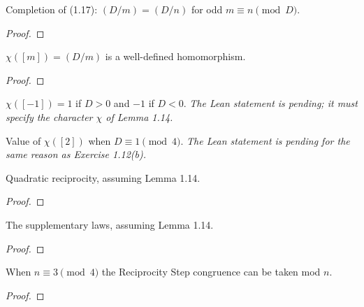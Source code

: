\begin{theorem}[Exercise 1.11]
  \label{exr:s1_11}
  \leanok
  Completion of (1.17): $(D/m) = (D/n)$ for odd $m \equiv n \pmod D$.
\end{theorem}
\begin{proof}\end{proof}

\begin{theorem}[Exercise 1.12(a)]
  \label{exr:s1_12_a}
  \leanok
  $\chi([m]) = (D/m)$ is a well-defined homomorphism.
\end{theorem}
\begin{proof}\end{proof}

\begin{theorem}[Exercise 1.12(b)]
  \label{exr:s1_12_b}
  \notready
  $\chi([-1]) = 1$ if $D > 0$ and $-1$ if $D < 0$. \emph{The Lean statement
  is pending; it must specify the character $\chi$ of Lemma 1.14.}
\end{theorem}

\begin{theorem}[Exercise 1.12(c)]
  \label{exr:s1_12_c}
  \notready
  Value of $\chi([2])$ when $D \equiv 1 \pmod 4$. \emph{The Lean statement
  is pending for the same reason as Exercise 1.12(b).}
\end{theorem}

\begin{theorem}[Exercise 1.13(a)]
  \label{exr:s1_13_a}
  \leanok
  Quadratic reciprocity, assuming Lemma 1.14.
\end{theorem}
\begin{proof}\end{proof}

\begin{theorem}[Exercise 1.13(b)]
  \label{exr:s1_13_b}
  \leanok
  The supplementary laws, assuming Lemma 1.14.
\end{theorem}
\begin{proof}\end{proof}

\begin{theorem}[Exercise 1.14]
  \label{exr:s1_14}
  \leanok
  When $n \equiv 3 \pmod 4$ the Reciprocity Step congruence can be taken mod $n$.
\end{theorem}
\begin{proof}\end{proof}

